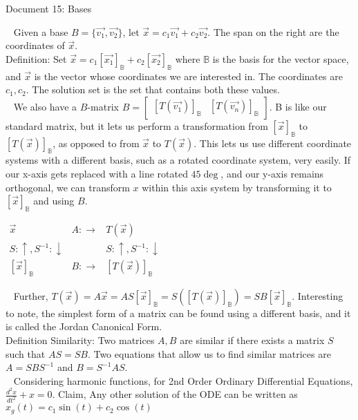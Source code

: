 \documentclass[11 pt]{article}
\begin{document}
\begin{center}
Document 15: Bases
\end{center}

\setlength{\leftskip}{0 in}
$\,\,\,$ Given a base $B=\lbrace \vec{v_1},\vec{v_2}\rbrace$, let $\vec{x}=c_1\vec{v_1}+c_2\vec{v_2}$. The span on the right are the coordinates of $\vec{x}$.\\

Definition: Set $\vec{x}=c_1[\vec{x_1}]_\mathbb{B}+c_2[\vec{x_2}]_\mathbb{B}$ where $\mathbb{B}$ is the basis for the vector space, and $\vec{x}$ is the vector whose coordinates we are interested in. The coordinates are $c_1,c_2$. The solution set is the set that contains both these values.\\

$\,\,\,$ We also have a $B$-matrix $B=\begin{bmatrix}[T(\vec{v_1})]_\mathbb{B} & [T(\vec{v_n})]_\mathbb{B}\end{bmatrix}$. B is like our standard matrix, but it lets us perform a transformation from $[\vec{x}]_\mathbb{B}$ to $[T(\vec{x})]_\mathbb{B}$, as opposed to from $\vec{x}$ to $T(\vec{x})$. This lets us use different coordinate systems with a different basis, such as a rotated coordinate system, very easily. If our x-axis gets replaced with a line rotated $45\deg$, and our y-axis remains orthogonal, we can transform $x$ within this axis system by transforming it to $[\vec{x}]_\mathbb{B}$ and using $B$.

\begin{center}
$\begin{matrix}
\vec{x} & A:\rightarrow & T(\vec{x})\\
S: \uparrow, S^{-1}: \downarrow & & S: \uparrow, S^{-1}: \downarrow\\
[\vec{x}]_\mathbb{B} & B: \rightarrow & [T(\vec{x})]_\mathbb{B}
\end{matrix}$\\
\end{center}

$\,\,\,$ Further, $T(\vec{x})=A\vec{x}=AS[\vec{x}]_\mathbb{B}=S([T(\vec{x})]_\mathbb{B})=SB[\vec{x}]_\mathbb{B}$. Interesting to note, the simplest form of a matrix can be found using a different basis, and it is called the Jordan Canonical Form.\\

Definition Similarity: Two matrices $A,B$ are similar if there exists a matrix $S$ such that $AS=SB$. Two equations that allow us to find similar matrices are $A=SBS^{-1}$ and $B=S^{-1}AS$.\\

$\,\,\,$ Considering harmonic functions, for 2nd Order Ordinary Differential Equations, $\frac{d^2x}{dt^2}+x=0$. Claim, Any other solution of the ODE can be written as $x_g(t)=c_1\sin(t)+c_2\cos(t)$
\end{document}
